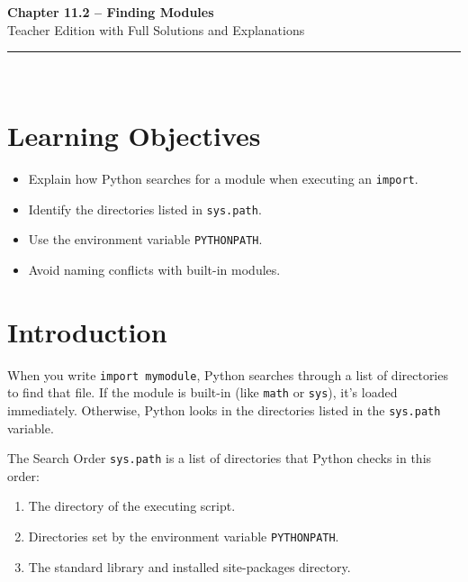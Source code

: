 \documentclass[12pt]{article}
\begin{document}
\begin{center}
  \vspace*{1cm}
  {\Huge \textbf{Chapter 11.2 – Finding Modules}}\\[0.5cm]
  {\Large Teacher Edition with Full Solutions and Explanations}\\[1cm]
  \rule{\textwidth}{0.4pt}\\[1cm]
\end{center}

\section{Learning Objectives}
\begin{itemize}
  \item Explain how Python searches for a module when executing an \texttt{import}.
  \item Identify the directories listed in \texttt{sys.path}.
  \item Use the environment variable \texttt{PYTHONPATH}.
  \item Avoid naming conflicts with built-in modules.
\end{itemize}

\section{Introduction}

When you write \texttt{import mymodule}, Python searches through a list of directories to find that file.  
If the module is built-in (like \texttt{math} or \texttt{sys}), it’s loaded immediately.  
Otherwise, Python looks in the directories listed in the \texttt{sys.path} variable.

\begin{conceptbox}{The Search Order}
\texttt{sys.path} is a list of directories that Python checks in this order:
\begin{enumerate}
  \item The directory of the executing script.
  \item Directories set by the environment variable \texttt{PYTHONPATH}.
  \item The standard library and installed site-packages directory.
\end{enumerate}
\end{conceptbox}
\end{document}
